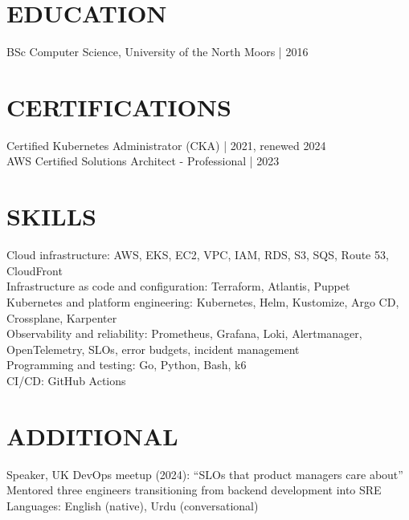 \documentclass[11pt,a4paper]{article}
\newcommand{\cvsection}[1]{\section*{#1}}
\begin{document}
\cvsection{EDUCATION}
BSc Computer Science, University of the North Moors | 2016

\cvsection{CERTIFICATIONS}
Certified Kubernetes Administrator (CKA) | 2021, renewed 2024\\
AWS Certified Solutions Architect - Professional | 2023

\cvsection{SKILLS}
Cloud infrastructure: AWS, EKS, EC2, VPC, IAM, RDS, S3, SQS, Route 53, CloudFront\\
Infrastructure as code and configuration: Terraform, Atlantis, Puppet\\
Kubernetes and platform engineering: Kubernetes, Helm, Kustomize, Argo CD, Crossplane, Karpenter\\
Observability and reliability: Prometheus, Grafana, Loki, Alertmanager, OpenTelemetry, SLOs, error budgets, incident management\\
Programming and testing: Go, Python, Bash, k6\\
CI/CD: GitHub Actions

\cvsection{ADDITIONAL}
Speaker, UK DevOps meetup (2024): “SLOs that product managers care about”\\
Mentored three engineers transitioning from backend development into SRE\\
Languages: English (native), Urdu (conversational)
\end{document}
